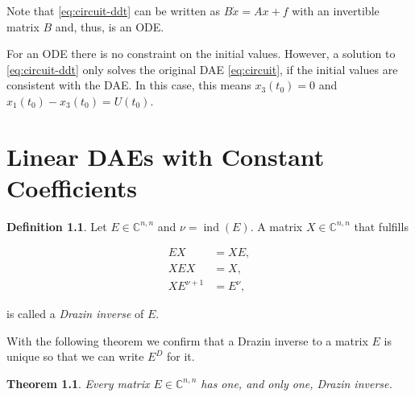 \documentclass[]{book}
\newtheorem{theorem}{Theorem}[chapter]
\theoremstyle{definition}
\newtheorem{definition}{Definition}[chapter]
\theoremstyle{definition}
\theoremstyle{definition}
\theoremstyle{remark}
\begin{document}
Note that \eqref{eq:circuit-ddt} can be written as \(B\dot x = Ax + f\) with an invertible matrix \(B\) and, thus, is an ODE.

For an ODE there is no constraint on the initial values. However, a solution to \eqref{eq:circuit-ddt} only solves the original DAE \eqref{eq:circuit}, if the initial values are consistent with the DAE. In this case, this means \(x_3(t_0)=0\) and \(x_1(t_0) - x_3(t_0) = U(t_0)\).

\hypertarget{linear-daes-with-constant-coefficients}{%
\chapter{Linear DAEs with Constant Coefficients}\label{linear-daes-with-constant-coefficients}}

\begin{definition}
\protect\hypertarget{def:drazin-inverse}{}{\label{def:drazin-inverse} }
Let \(E\in \mathbb C^{n,n}\) and \(\nu = \operatorname{ind}(E)\). A matrix \(X\in \mathbb C^{n,n}\) that fulfills

\begin{align}
    EX & = XE, \label{eq:def-drazin-a} \\
    XEX & = X, \label{eq:def-drazin-b} \\
    XE^{\nu+1} & = E^{\nu}, \label{eq:def-drazin-c}
\end{align}

is called a \emph{Drazin inverse} of \(E\).
\end{definition}

With the following theorem we confirm that a Drazin inverse to a matrix \(E\) is unique so that we can write \(E^D\) for it.

\begin{theorem}
\protect\hypertarget{thm:drazin-inverse-unique}{}{\label{thm:drazin-inverse-unique} }
Every matrix \(E\in\mathbb{C}^{n,n}\) has one, and only one, Drazin inverse.
\end{theorem}
\end{document}
